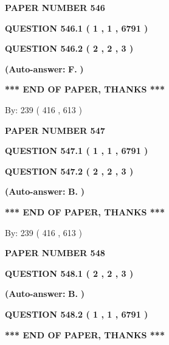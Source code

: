 \documentclass[12pt]{article}
\begin{document}
   
 {\textbf{ \Large{ PAPER NUMBER  546  }}}
   
   
   
   
  
  
{\textbf{\large{QUESTION
546.1 
 ( 1 , 1 , 6791 )
}}}
  
  
{\textbf{\large{QUESTION
546.2 
 ( 2 , 2 , 3 )
}}}
 
 
{\textbf{(Auto-answer:}}
{\textbf{\large{
F.}}}
{\textbf{)}}
 
 
   
   
   
   
\vspace{1.0in} 
{\textbf{\large{ *** END OF PAPER, THANKS *** }}} 
   
   
\hspace{1.0in} By: 
 239 ( 416 ,  613 )
   
   
   
   
\newpage 
\setcounter{page}{ 
   547001 } 
   
   
 {\textbf{ \Large{ PAPER NUMBER  547  }}}
   
   
   
   
  
  
{\textbf{\large{QUESTION
547.1 
 ( 1 , 1 , 6791 )
}}}
  
  
{\textbf{\large{QUESTION
547.2 
 ( 2 , 2 , 3 )
}}}
 
 
{\textbf{(Auto-answer:}}
{\textbf{\large{
B.}}}
{\textbf{)}}
 
 
   
   
   
   
\vspace{1.0in} 
{\textbf{\large{ *** END OF PAPER, THANKS *** }}} 
   
   
\hspace{1.0in} By: 
 239 ( 416 ,  613 )
   
   
   
   
\newpage 
\setcounter{page}{ 
   548001 } 
   
   
 {\textbf{ \Large{ PAPER NUMBER  548  }}}
   
   
   
   
  
  
{\textbf{\large{QUESTION
548.1 
 ( 2 , 2 , 3 )
}}}
 
 
{\textbf{(Auto-answer:}}
{\textbf{\large{
B.}}}
{\textbf{)}}
 
 
  
  
{\textbf{\large{QUESTION
548.2 
 ( 1 , 1 , 6791 )
}}}
   
   
   
   
\vspace{1.0in} 
{\textbf{\large{ *** END OF PAPER, THANKS *** }}} 
   
\end{document}

